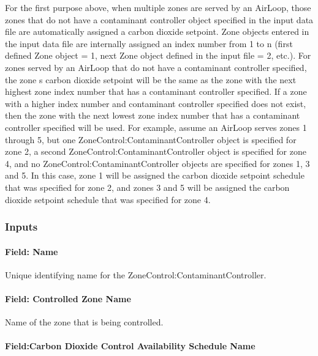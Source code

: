 For the first purpose above, when multiple zones are served by an AirLoop, those zones that do not have a contaminant controller object specified in the input data file are automatically assigned a carbon dioxide setpoint. Zone objects entered in the input data file are internally assigned an index number from 1 to n (first defined Zone object = 1, next Zone object defined in the input file = 2, etc.). For zones served by an AirLoop that do not have a contaminant controller specified, the zone s carbon dioxide setpoint will be the same as the zone with the next highest zone index number that has a contaminant controller specified. If a zone with a higher index number and contaminant controller specified does not exist, then the zone with the next lowest zone index number that has a contaminant controller specified will be used. For example, assume an AirLoop serves zones 1 through 5, but one ZoneControl:ContaminantController object is specified for zone 2, a second ZoneControl:ContaminantController object is specified for zone 4, and no ZoneControl:ContaminantController objects are specified for zones 1, 3 and 5. In this case, zone 1 will be assigned the carbon dioxide setpoint schedule that was specified for zone 2, and zones 3 and 5 will be assigned the carbon dioxide setpoint schedule that was specified for zone 4.

\subsubsection{Inputs}\label{inputs-14-017}

\paragraph{Field: Name}\label{field-name-12-013}

Unique identifying name for the ZoneControl:ContaminantController.

\paragraph{Field: Controlled Zone Name}\label{field-controlled-zone-name-000}

Name of the zone that is being controlled.

\paragraph{Field:Carbon Dioxide Control Availability Schedule Name}\label{fieldcarbon-dioxide-control-availability-schedule-name}

